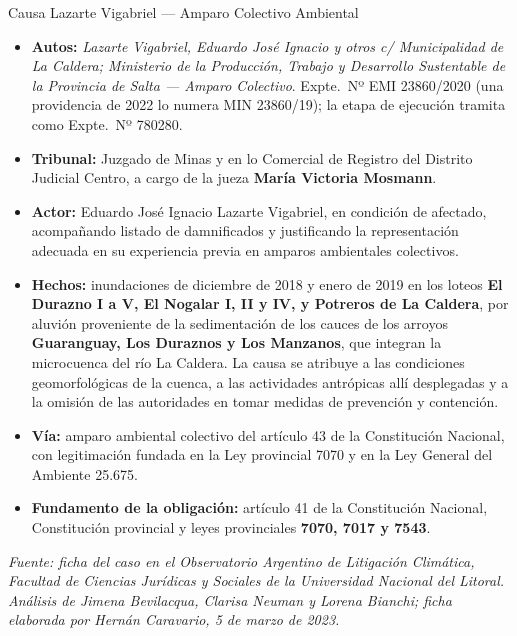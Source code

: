 \begin{ficha}{Causa Lazarte Vigabriel --- Amparo Colectivo Ambiental}
\begin{itemize}[leftmargin=*,nosep]
\item \textbf{Autos:} \textit{Lazarte Vigabriel, Eduardo José Ignacio y otros c/ Municipalidad de La Caldera; Ministerio de la Producción, Trabajo y Desarrollo Sustentable de la Provincia de Salta --- Amparo Colectivo}. Expte.\ Nº EMI 23860/2020 (una providencia de 2022 lo numera MIN 23860/19); la etapa de ejecución tramita como Expte.\ Nº 780280.
\item \textbf{Tribunal:} Juzgado de Minas y en lo Comercial de Registro del Distrito Judicial Centro, a cargo de la jueza \textbf{María Victoria Mosmann}.
\item \textbf{Actor:} Eduardo José Ignacio Lazarte Vigabriel, en condición de afectado, acompañando listado de damnificados y justificando la representación adecuada en su experiencia previa en amparos ambientales colectivos.
\item \textbf{Hechos:} inundaciones de diciembre de 2018 y enero de 2019 en los loteos \textbf{El Durazno I a V, El Nogalar I, II y IV, y Potreros de La Caldera}, por aluvión proveniente de la sedimentación de los cauces de los arroyos \textbf{Guaranguay, Los Duraznos y Los Manzanos}, que integran la microcuenca del río La Caldera. La causa se atribuye a las condiciones geomorfológicas de la cuenca, a las actividades antrópicas allí desplegadas y a la omisión de las autoridades en tomar medidas de prevención y contención.
\item \textbf{Vía:} amparo ambiental colectivo del artículo 43 de la Constitución Nacional, con legitimación fundada en la Ley provincial 7070 y en la Ley General del Ambiente 25.675.
\item \textbf{Fundamento de la obligación:} artículo 41 de la Constitución Nacional, Constitución provincial y leyes provinciales \textbf{7070, 7017 y 7543}.
\end{itemize}
\textit{Fuente: ficha del caso en el Observatorio Argentino de Litigación Climática, Facultad de Ciencias Jurídicas y Sociales de la Universidad Nacional del Litoral. Análisis de Jimena Bevilacqua, Clarisa Neuman y Lorena Bianchi; ficha elaborada por Hernán Caravario, 5 de marzo de 2023.}
\end{ficha}

